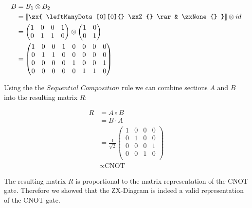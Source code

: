 \begin{align*}
    B                                 & = B_1 \otimes B_2               \\
                                      & =\left \llbracket \zx{
    \leftManyDots[0][0]{} \zxZ{} \rar & \zxNone{}
    } \right \rrbracket \otimes id                                      \\
                                      & =
    \begin{pmatrix}
        1 & 0 & 0 & 1 \\
        0 & 1 & 1 & 0 \\
    \end{pmatrix}
    \otimes
    \begin{pmatrix}
        1 & 0 \\
        0 & 1 \\
    \end{pmatrix}                                                      \\
                                      & = \begin{pmatrix}
                                              1 & 0 & 0 & 1 & 0 & 0 & 0 & 0 \\
                                              0 & 1 & 1 & 0 & 0 & 0 & 0 & 0 \\
                                              0 & 0 & 0 & 0 & 1 & 0 & 0 & 1 \\
                                              0 & 0 & 0 & 0 & 0 & 1 & 1 & 0 \\
                                          \end{pmatrix}
\end{align*}


Using the the $\textit{Sequential Composition}$ rule we can combine sections $A$ and $B$ into the resulting matrix $R$:

\begin{align*}
    R & = A \circ B         \\
      & = B \cdot A         \\
      & =
    \frac{1}{\sqrt{2}}
    \begin{pmatrix}
        1 & 0 & 0 & 0 \\
        0 & 1 & 0 & 0 \\
        0 & 0 & 0 & 1 \\
        0 & 0 & 1 & 0 \\
    \end{pmatrix}          \\
      & \propto \text{CNOT}
\end{align*}

The resulting matrix $R$ is proportional to the matrix representation of the CNOT gate. Therefore we showed that the ZX-Diagram \zx{
    \zxNone{} \rar & \zxNone{} \rar  &\zxZ{}\rar  &\\
    \zxNone{} \rar & \zxX{} \rar \ar[ru]  &\rar& \\
} is indeed a valid representation of the CNOT gate.


